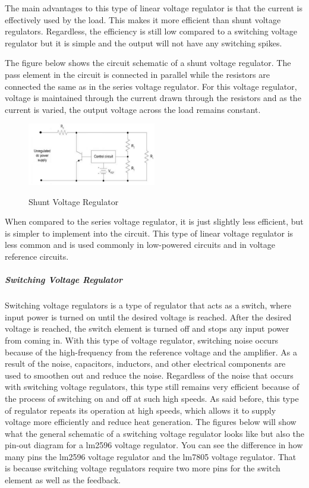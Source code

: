 The main advantages to this type of linear voltage regulator is that the current is effectively used by the load. This makes it more efficient than shunt voltage regulators. Regardless, the efficiency is still low compared to a switching voltage regulator but it is simple and the output will not have any switching spikes.\par
The figure below shows the circuit schematic of a shunt voltage regulator. The pass element in the circuit is connected in parallel while the resistors are connected the same as in the series voltage regulator. For this voltage regulator, voltage is maintained through the current drawn through the resistors and as the current is varied, the output voltage across the load remains constant. \par
\begin{figure}[H]
    \caption{Shunt Voltage Regulator}
    \centering
    \includegraphics[width=0.5\textwidth]{images/Shunt_Voltage_Regulator.png}
    \label{fig:shunt-voltage-regulator}
\end{figure}
When compared to the series voltage regulator, it is just slightly less efficient, but is simpler to implement into the circuit. This type of linear voltage regulator is less common and is used commonly in low-powered circuits and in voltage reference circuits.\par
\subparagraph{Switching Voltage Regulator}
Switching voltage regulators is a type of regulator that acts as a switch, where input power is turned on until the desired voltage is reached. After the desired voltage is reached, the switch element is turned off and stops any input power from coming in. With this type of voltage regulator, switching noise occurs because of the high-frequency from the reference voltage and the amplifier. As a result of the noise, capacitors, inductors, and other electrical components are used to smoothen out and reduce the noise. Regardless of the noise that occurs with switching voltage regulators, this type still remains very efficient because of the process of switching on and off at such high speeds. As said before, this type of regulator repeats its operation at high speeds, which allows it to supply voltage more efficiently and reduce heat generation. The figures below will show what the general schematic of a switching voltage regulator looks like but also the pin-out diagram for a lm2596 voltage regulator. You can see the difference in how many pins the lm2596 voltage regulator and the lm7805 voltage regulator. That is because switching voltage regulators require two more pins for the switch element as well as the feedback.\par
